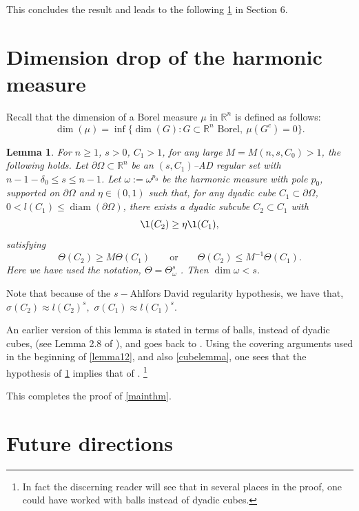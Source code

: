 \documentclass{article}
\newcounter{lem}
\theoremstyle{plain}
\theoremstyle{plain}
\newtheorem{lemma}[theorem]{Lemma}
\theoremstyle{definition}
\theoremstyle{plain}
\begin{document}
This concludes the result and leads to the following \cref{lemma11} in Section 6.






\section{Dimension drop of the harmonic measure}

Recall that the dimension of a Borel measure $\mu$ in $\mathbb{R}^n$ is defined as follows:
\[
\dim(\mu)
=
\inf\bigl\{ \dim(G) : G \subset \mathbb{R}^n \text{ Borel},\ \mu(G^{c})=0 \bigr\}.
\]



\begin{lemma}\label{lemma11}
For $n \ge 1$, $s>0$, $C_1>1$, for any large $M=M(n,s,C_0)>1$, the following holds. Let $\partial\Omega \subset \mathbb{R}^{n}$ be an
$(s,C_1)$--AD regular set with $n-1-\delta_0 \leq s\leq n-1$. Let $\omega:=\omega^{p_0}$ be the harmonic measure with pole $p_0$, supported on $\partial\Omega$ and
$\eta \in (0,1)$ such that, for any dyadic cube $C_1 \subset \partial\Omega$, $0<l(C_1) \le
\operatorname{diam}(\partial\Omega)$, there exists a dyadic subcube $C_2\subset C_1$ with
\[
  \l(C_2)\geq \eta \l(C_1),
\]
satisfying 
\begin{equation}
\Theta(C_2)
\ge
M\Theta(C_1)
\qquad\text{or}\qquad
\Theta(C_2)
\le
M^{-1}\Theta(C_1).
\end{equation}
Here we have used the notation, $\Theta=\Theta^{s}_\omega$ . Then $\dim \omega < s$.
\end{lemma}

Note that because of the $s-$Ahlfors David regularity hypothesis, we have that, $\sigma(C_2)\approx l(C_2)^s,$ $ \sigma(C_1)\approx l(C_1)^s$.

An earlier version of this lemma is stated in terms of balls, instead of dyadic cubes, (see Lemma 2.8 of \cite{Tol24}), and goes back to \cite{Bou87,Bat96}. Using the covering arguments used in the beginning of \cref{lemma12}, and also \cref{cubelemma}, one sees that the hypothesis of \cref{lemma11} implies that of \cite{Tol24}. \footnote{In fact the discerning reader will see that in several places in the proof, one could have worked with balls instead of dyadic cubes.}

This completes the proof of \cref{mainthm}.

\section{Future directions}
\end{document}
